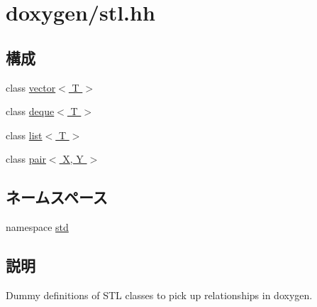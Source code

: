 \hypertarget{stl_8hh}{
\section{doxygen/stl.hh}
\label{stl_8hh}
}
\subsection*{構成}
\begin{DoxyCompactItemize}
\item 
class \hyperlink{classstd_1_1vector}{vector$<$ T $>$}
\item 
class \hyperlink{classstd_1_1deque}{deque$<$ T $>$}
\item 
class \hyperlink{classstd_1_1list}{list$<$ T $>$}
\item 
class \hyperlink{classstd_1_1pair}{pair$<$ X, Y $>$}
\end{DoxyCompactItemize}
\subsection*{ネームスペース}
\begin{DoxyCompactItemize}
\item 
namespace \hyperlink{namespacestd}{std}
\end{DoxyCompactItemize}


\subsection{説明}
Dummy definitions of STL classes to pick up relationships in doxygen. 